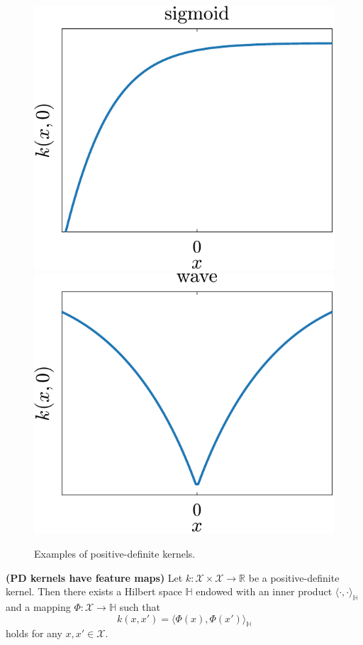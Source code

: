 \begin{figure}[t]
	\includegraphics[scale=0.4]{../images/chap2_kernel_sg.pdf} \hspace{3pt}
	\includegraphics[scale=0.4]{../images/chap2_kernel_wv.pdf} 
	\caption{Examples of positive-definite kernels.}
	\label{fig.pd_kernels}
\end{figure}

\begin{proposition}
	\label{thm.pd_kernels_feature_maps}
	\textbf{(PD kernels have feature maps)} 
	Let $k:\mathcal{X} \times \mathcal{X} \rightarrow \mathbb{R} $ be a positive-definite kernel. Then there exists a Hilbert space $\mathbb{H}$ endowed with an inner product $\langle \cdot,\cdot \rangle_\mathbb{H}$ and a mapping $\Phi :  \mathcal{X} \rightarrow \mathbb{H}$ such that 
	\begin{equation}
		\label{eq.kernels_feat_maps}
		k(x,x') = \langle \Phi(x),\Phi(x') \rangle_\mathbb{H}
	\end{equation}
	holds for any $x,x' \in \mathcal{X}$.
\end{proposition}

